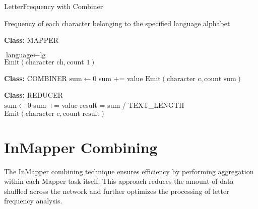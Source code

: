 \begin{algorithm}
    \caption{LetterFrequency with Combiner}
    \begin{algorithmic}[1]
    \Ensure Frequency of each character belonging to the specified language alphabet
    \\
    \Statex
    
    \textbf{Class:} MAPPER

        \State $\text{language} \gets \text{lg}$ 
    \EndProcedure\\

        \State {} \gets {}
                \State $\text{Emit}(\text{character ch}, \text{count 1})$
        \EndFor
    \EndProcedure\\

    
    \Statex
    
    \textbf{Class:} COMBINER
                \State $\text{sum} \gets 0$
            \State sum += value
        \EndFor
        \State $\text{Emit}(\text{character c}, \text{count sum})$
    \EndProcedure\\
    
    \Statex
    
    \textbf{Class:} REDUCER
        \State {} \gets {}
    \EndProcedure\\
    
        \State $\text{sum} \gets 0$
            \State sum += value
        \EndFor
        \State result = sum / TEXT\_LENGTH
        \State $\text{Emit}(\text{character c}, \text{count result})$
    \EndProcedure
    
    \end{algorithmic}
    \end{algorithm}






\section{InMapper Combining}
The InMapper combining technique ensures efficiency by performing aggregation within each Mapper task itself. This approach reduces the amount of data shuffled across the network and further optimizes the processing of letter frequency analysis.


